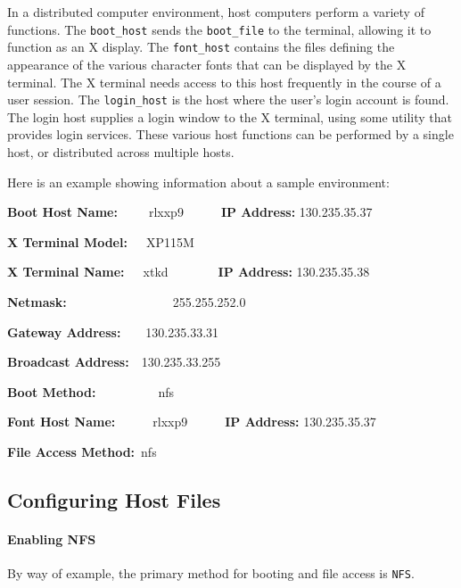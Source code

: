 In a distributed computer environment, host computers perform a variety of
functions. The {\tt boot\_host} sends the {\tt boot\_file} to the terminal,
allowing it to function as an X display. The {\tt font\_host} contains the
files defining the appearance of the various character fonts that can be
displayed by the X terminal. The X terminal needs access to this host
frequently in the course of a user session. The {\tt login\_host} is the host
where the user's login account is found. The login host supplies a login window
to the X terminal, using some utility that provides login services. These
various host functions can be performed by a single host, or distributed across
multiple hosts.

Here is an example showing information about a sample environment:

{\bf Boot Host Name:}\ \ \ \ \ rlxxp9\ \ \ \ \ \ {\bf IP Address:} 130.235.35.37

{\bf X Terminal Model:}\ \ \ XP115M

{\bf X Terminal Name:}\ \ \ xtkd\ \ \ \ \ \ \ \ {\bf IP Address:} 130.235.35.38

{\bf Netmask:}\ \ \ \ \ \ \ \ \ \ \ \ \ \ \ \ \ 255.255.252.0

{\bf Gateway Address:}\ \ \ \ 130.235.33.31

{\bf Broadcast Address:}\ \ 130.235.33.255

{\bf Boot Method:}\ \ \ \ \ \ \ \ \ \ nfs

{\bf Font Host Name:}\ \ \ \ \ \ rlxxp9\ \ \ \ \ \ {\bf IP Address:} 130.235.35.37

{\bf File Access Method:}\ nfs


\subsection {Configuring Host Files}

\paragraph {Enabling NFS} By way of example, the primary method for booting and
file access is {\tt NFS}.

